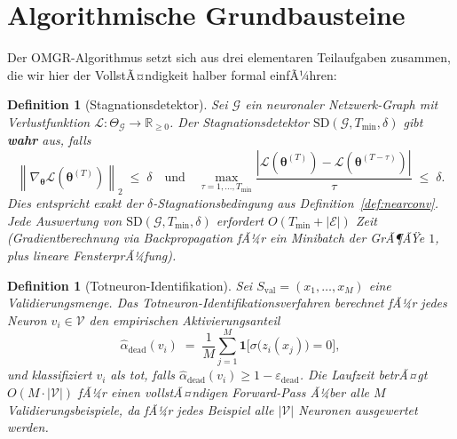 ﻿\documentclass[12pt, a4paper, openany]{report}
\newtheorem{definition}[theorem]{Definition}
\newcommand{\R}{\mathbb{R}}
\newcommand{\calG}{\mathcal{G}}
\newcommand{\calL}{\mathcal{L}}
\newcommand{\calV}{\mathcal{V}}
\newcommand{\calE}{\mathcal{E}}
\newcommand{\norms}[1]{\left\|#1\right\|}
\newcommand{\abs}[1]{\left|#1\right|}
\newcommand{\eps}{\varepsilon}
\begin{document}
\section{Algorithmische Grundbausteine}
\label{sec:algo_building_blocks}

Der OMGR-Algorithmus setzt sich aus drei elementaren Teilaufgaben zusammen,
die wir hier der VollstÃ¤ndigkeit halber formal einfÃ¼hren:

\begin{definition}[Stagnationsdetektor]
\label{def:stagnation_detector}
Sei $\calG$ ein neuronaler Netzwerk-Graph mit Verlustfunktion
$\calL : \Theta_{\calG} \to \R_{\geq 0}$.  Der \emph{Stagnationsdetektor}
$\mathrm{SD}(\calG, T_{\min}, \delta)$ gibt \textbf{wahr} aus, falls
\begin{equation}
  \label{eq:sd_condition}
  \norms{\nabla_{\bm{\theta}} \calL(\bm{\theta}^{(T)})}_2 \;\leq\; \delta
  \quad\text{und}\quad
  \max_{\tau=1,\ldots,T_{\min}}
  \frac{\abs{\calL(\bm{\theta}^{(T)}) - \calL(\bm{\theta}^{(T-\tau)})}}{\tau}
  \;\leq\; \delta.
\end{equation}
Dies entspricht exakt der $\delta$-Stagnationsbedingung aus
Definition~\ref{def:nearconv}.  Jede Auswertung von
$\mathrm{SD}(\calG, T_{\min}, \delta)$ erfordert
$O(T_{\min} + |\calE|)$ Zeit (Gradientberechnung via Backpropagation
fÃ¼r ein Minibatch der GrÃ¶ÃŸe $1$, plus lineare FensterprÃ¼fung).
\end{definition}

\begin{definition}[Totneuron-Identifikation]
\label{def:dead_identification}
Sei $S_{\mathrm{val}} = (x_1, \ldots, x_M)$ eine Validierungsmenge.
Das \emph{Totneuron-Identifikationsverfahren} berechnet fÃ¼r jedes Neuron
$v_i \in \calV$ den empirischen Aktivierungsanteil
\begin{equation}
  \label{eq:dead_rate}
  \hat{\alpha}_{\mathrm{dead}}(v_i)
  \;=\;
  \frac{1}{M}\sum_{j=1}^{M}
  \mathbf{1}\!\bigl[\sigma\bigl(z_i(x_j)\bigr) = 0\bigr],
\end{equation}
und klassifiziert $v_i$ als tot, falls $\hat{\alpha}_{\mathrm{dead}}(v_i) \geq 1 - \eps_{\mathrm{dead}}$.
Die Laufzeit betrÃ¤gt $O(M \cdot |\calV|)$ fÃ¼r einen vollstÃ¤ndigen Forward-Pass
Ã¼ber alle $M$ Validierungsbeispiele, da fÃ¼r jedes Beispiel alle $|\calV|$ Neuronen
ausgewertet werden.
\end{definition}
\end{document}
